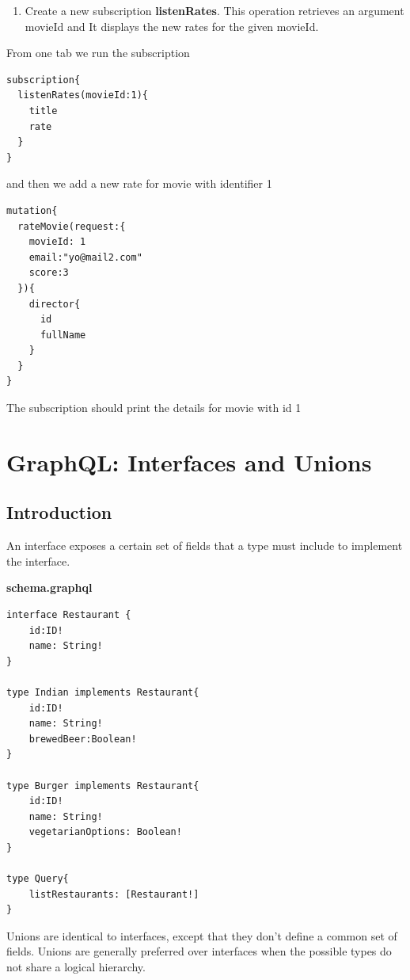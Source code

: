 \documentclass[]{book}
\providecommand{\tightlist}{%
  \setlength{\itemsep}{0pt}\setlength{\parskip}{0pt}}
\begin{document}
\begin{enumerate}
\def\labelenumi{\arabic{enumi}.}
\setcounter{enumi}{4}
\tightlist
\item
  Create a new subscription \textbf{listenRates}. This operation
  retrieves an argument movieId and It displays the new rates for the
  given movieId.
\end{enumerate}

From one tab we run the subscription

\begin{verbatim}
subscription{
  listenRates(movieId:1){
    title
    rate
  }
}
\end{verbatim}

and then we add a new rate for movie with identifier 1

\begin{verbatim}
mutation{
  rateMovie(request:{
    movieId: 1
    email:"yo@mail2.com"
    score:3
  }){
    director{
      id
      fullName
    }
  }
}
\end{verbatim}

The subscription should print the details for movie with id 1

\chapter{GraphQL: Interfaces and
Unions}\label{graphql-interfaces-and-unions}

\section{Introduction}\label{introduction-3}

An interface exposes a certain set of fields that a type must include to
implement the interface.

\textbf{schema.graphql}

\begin{verbatim}
interface Restaurant {
    id:ID!
    name: String!
}

type Indian implements Restaurant{
    id:ID!
    name: String!
    brewedBeer:Boolean!
}

type Burger implements Restaurant{
    id:ID!
    name: String!
    vegetarianOptions: Boolean!
}

type Query{
    listRestaurants: [Restaurant!]
}
\end{verbatim}

Unions are identical to interfaces, except that they don't define a
common set of fields. Unions are generally preferred over interfaces
when the possible types do not share a logical hierarchy.
\end{document}
